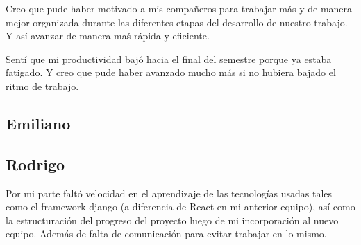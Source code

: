 \documentclass[12pt]{article}
\newcounter{ni}
\begin{document}
Creo que pude haber motivado a mis compañeros para trabajar más y de manera mejor organizada durante las diferentes etapas del desarrollo de nuestro trabajo. Y así avanzar de manera maś rápida y eficiente.

Sentí que mi productividad bajó hacia el final del semestre porque ya estaba fatigado. Y creo que pude haber avanzado mucho más si no hubiera bajado el ritmo de trabajo.

\subsection{Emiliano}
\subsection{Rodrigo}
Por mi parte faltó velocidad en el aprendizaje de las tecnologías usadas tales como el framework django (a diferencia de React en mi anterior equipo),
así como la estructuración del progreso del proyecto luego de mi incorporación al nuevo equipo. Además de falta de comunicación para evitar trabajar en lo mismo.
\end{document}
